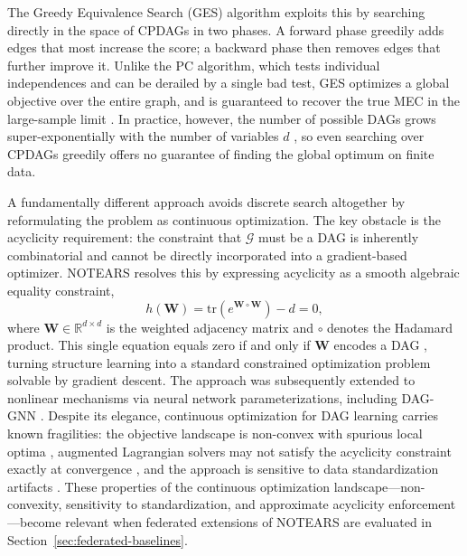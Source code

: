The Greedy Equivalence Search (GES) algorithm \cite{Chickering1996LearningEC} exploits this by searching directly in the space of CPDAGs in two phases.
A forward phase greedily adds edges that most increase the score; a backward phase then removes edges that further improve it.
Unlike the PC algorithm, which tests individual independences and can be derailed by a single bad test, GES optimizes a global objective over the entire graph, and is guaranteed to recover the true MEC in the large-sample limit \cite{Chickering2002OptimalSI}.
In practice, however, the number of possible DAGs grows super-exponentially with the number of variables $d$ \cite{Peters2017ElementsOC}, so even searching over CPDAGs greedily offers no guarantee of finding the global optimum on finite data.

A fundamentally different approach avoids discrete search altogether by reformulating the problem as continuous optimization.
The key obstacle is the acyclicity requirement: the constraint that $\mathcal{G}$ must be a DAG is inherently combinatorial and cannot be directly incorporated into a gradient-based optimizer.
NOTEARS \cite{Zheng2018DAGsWN} resolves this by expressing acyclicity as a smooth algebraic equality constraint,
\begin{equation}
    h(\mathbf{W}) = \mathrm{tr}\!\left(e^{\mathbf{W} \circ \mathbf{W}}
    \right) - d = 0,
    \label{eq:notears}
\end{equation}
where $\mathbf{W} \in \mathbb{R}^{d \times d}$ is the weighted
adjacency matrix and $\circ$ denotes the Hadamard product.
This single equation equals zero if and only if $\mathbf{W}$ encodes
a DAG \cite{Zheng2018DAGsWN}, turning structure learning into a standard
constrained optimization problem solvable by gradient descent.
The approach was subsequently extended to nonlinear mechanisms via
neural network parameterizations, including DAG-GNN
\cite{Yu2019DAGGNNDS}.
Despite its elegance, continuous optimization for DAG learning carries known fragilities: the objective landscape is non-convex with spurious local optima \cite{Ng2023StructureLW}, augmented Lagrangian solvers may not satisfy the acyclicity constraint exactly at convergence \cite{Wei2020DAGsWN}, and the approach is sensitive to data standardization artifacts \cite{Reisach2021BewareOT}.
These properties of the continuous optimization landscape---non-convexity, sensitivity to standardization, and approximate acyclicity enforcement---become relevant when federated extensions of NOTEARS are evaluated in Section~\ref{sec:federated-baselines}.

